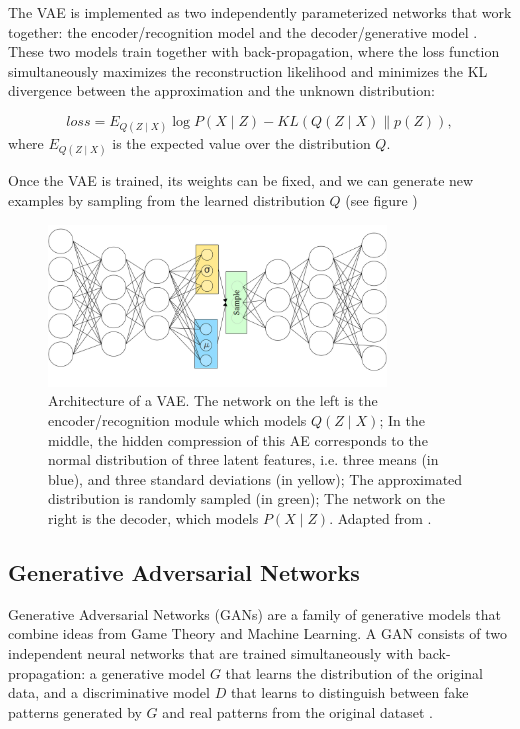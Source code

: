 \documentclass{article}
\begin{document}
The VAE is implemented as two independently parameterized networks that work together: the encoder/recognition model and the decoder/generative model \cite{bengio2017deep}. These two models train together with back-propagation, where the loss function simultaneously maximizes the reconstruction likelihood and minimizes the KL divergence between the approximation and the unknown distribution:

\begin{equation}
    loss = E_{Q(Z \mid X)} \log P(X \mid Z)-K L(Q(Z \mid X) \| p(Z)),
\end{equation}
where  \(E_{Q(Z \mid X)}\) is the expected value over the distribution \(Q\).
\newline

Once the VAE is trained, its weights can be fixed, and we can generate new examples by sampling from the learned distribution \(Q\) (see figure )

\begin{figure}[h]
    \centering
    \includegraphics[width=0.8\textwidth]{introduction/img/VAE.png}
    \caption{Architecture of a VAE. The network on the left is the encoder/recognition module which models \(Q(Z \mid X)\); In the middle, the hidden compression of this AE corresponds to the normal distribution of three latent features, i.e. three means (in blue), and three standard deviations (in yellow); The approximated distribution is randomly sampled (in green); The network on the right is the decoder, which models \(P(X \mid Z)\). Adapted from \cite{shafkat2018VAE}.}
\label{fig:VAE}
\end{figure}

\subsection{Generative Adversarial Networks}
Generative Adversarial Networks (GANs) are a family of generative models that combine ideas from Game Theory and Machine Learning. A GAN consists of two independent neural networks that are trained simultaneously with back-propagation: a generative model $G$ that learns the distribution of the original data, and a discriminative model $D$ that learns to distinguish between fake patterns generated by $G$ and real patterns from the original dataset \cite{goodfellow2014generative}.
\end{document}
